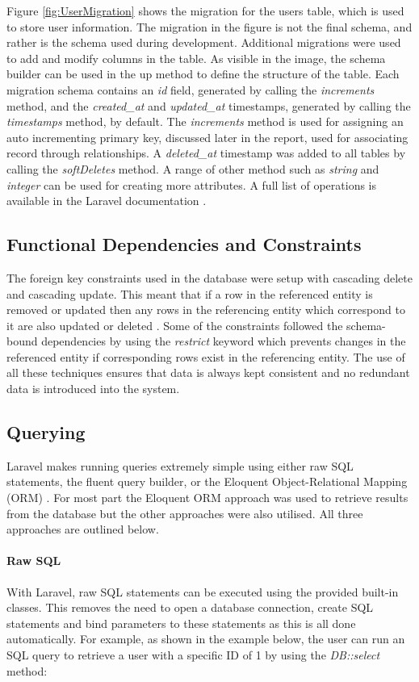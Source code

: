 Figure \ref{fig:UserMigration} shows the migration for the users table, which is used to store user information. The migration in the figure is not the final schema, and rather is the schema used during development. Additional migrations were used to add and modify columns in the table. As visible in the image, the schema builder can be used in the up method to define the structure of the table. Each migration schema contains an \emph{id} field, generated by calling the \emph{increments} method, and the \emph{created\_at} and \emph{updated\_at} timestamps, generated by calling the \emph{timestamps} method, by default. The \emph{increments} method is used for assigning an auto incrementing primary key, discussed later in the report, used for associating record through relationships. A \emph{deleted\_at} timestamp was added to all tables by calling the \emph{softDeletes} method. A range of other method such as \emph{string} and \emph{integer} can be used for creating more attributes. A full list of operations is available in the Laravel documentation \cite{Laravel:Migrations}. 

\subsection{Functional Dependencies and Constraints}
The foreign key constraints used in the database were setup with cascading delete and cascading update. This meant that if a row in the referenced entity is removed or updated then any rows in the referencing entity which correspond to it are also updated or deleted \cite{TechOnTheNet:Cascading}. Some of the constraints followed the schema-bound dependencies by using the \emph{restrict} keyword which prevents changes in the referenced entity if corresponding rows exist in the referencing entity. The use of all these techniques ensures that data is always kept consistent and no redundant data is introduced into the system.

\subsection{Querying}
Laravel makes running queries extremely simple using either raw SQL statements, the fluent query builder, or the Eloquent Object-Relational Mapping (ORM) \cite{Laravel:Database}. For most part the Eloquent ORM approach was used to retrieve results from the database but the other approaches were also utilised. All three approaches are outlined below.

\paragraph{Raw SQL}
With Laravel, raw SQL statements can be executed using the provided built-in classes. This removes the need to open a database connection, create SQL statements and bind parameters to these statements as this is all done automatically. For example, as shown in the example below, the user can run an SQL query to retrieve a user with a specific ID of 1 by using the \emph{DB::select} method:

